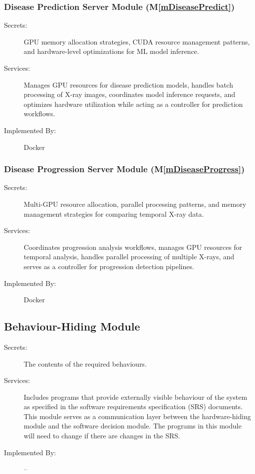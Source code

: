 \documentclass[12pt, titlepage]{article}
\newcommand{\mref}[1]{M\ref{#1}}
\begin{document}
\subsubsection{Disease Prediction Server Module (\mref{mDiseasePredict})}
\begin{description}
\item[Secrets:] GPU memory allocation strategies, CUDA resource management patterns, and hardware-level optimizations for ML model inference.
\item[Services:] Manages GPU resources for disease prediction models, handles batch processing of X-ray images, coordinates model inference requests, and optimizes hardware utilization while acting as a controller for prediction workflows.
\item[Implemented By:] Docker
\end{description}
\subsubsection{Disease Progression Server Module (\mref{mDiseaseProgress})}
\begin{description}
\item[Secrets:] Multi-GPU resource allocation, parallel processing patterns, and memory management strategies for comparing temporal X-ray data.
\item[Services:] Coordinates progression analysis workflows, manages GPU resources for temporal analysis, handles parallel processing of multiple X-rays, and serves as a controller for progression detection pipelines.
\item[Implemented By:] Docker
\end{description}

\subsection{Behaviour-Hiding Module}

\begin{description}
\item[Secrets:]The contents of the required behaviours.
\item[Services:]Includes programs that provide externally visible behaviour of
  the system as specified in the software requirements specification (SRS)
  documents. This module serves as a communication layer between the
  hardware-hiding module and the software decision module. The programs in this
  module will need to change if there are changes in the SRS.
\item[Implemented By:] --
\end{description}
\end{document}

